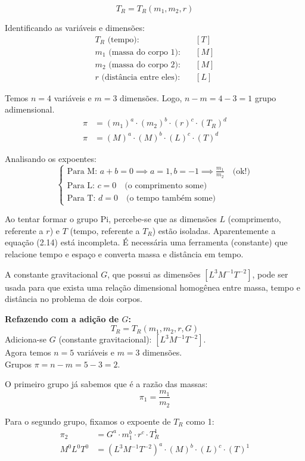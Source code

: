 

\[ T_R = T_R(m_1, m_2, r) \]

\noindent Identificando as variáveis e dimensões:
\begin{align*}
T_R \text{ (tempo):} \quad &[T] \\
m_1 \text{ (massa do corpo 1):} \quad &[M] \\
m_2 \text{ (massa do corpo 2):} \quad &[M] \\
r \text{ (distância entre eles):} \quad &[L]
\end{align*}

Temos $n = 4$ variáveis e $m = 3$ dimensões. Logo, $n - m = 4 - 3 = 1$ grupo adimensional.
\begin{align*}
\pi &= (m_1)^a \cdot (m_2)^b \cdot (r)^c \cdot (T_R)^d \\
\pi &= (M)^a \cdot (M)^b \cdot (L)^c \cdot (T)^d
\end{align*}

Analisando os expoentes:
\[
\begin{cases}
\text{Para M: } a + b = 0 \implies a = 1, b = -1 \implies \frac{m_1}{m_2} \quad \text{(ok!)} \\
\text{Para L: } c = 0 \quad \text{(o comprimento some)} \\
\text{Para T: } d = 0 \quad \text{(o tempo também some)}
\end{cases}
\]

Ao tentar formar o grupo Pi, percebe-se que as dimensões $L$ (comprimento, referente a $r$) e $T$ (tempo, referente a $T_R$) estão isoladas. Aparentemente a equação (2.14) está incompleta. É necessária uma ferramenta (constante) que relacione tempo e espaço e converta massa e distância em tempo. 

A constante gravitacional $G$, que possui as dimensões $[L^3 M^{-1} T^{-2}]$, pode ser usada para que exista uma relação dimensional homogênea entre massa, tempo e distância no problema de dois corpos.

\vspace{0.5cm}
\noindent\textbf{Refazendo com a adição de $G$:}
\[ T_R = T_R(m_1, m_2, r, G) \]
Adiciona-se $G$ (constante gravitacional): $[L^3 M^{-1} T^{-2}]$. \\
Agora temos $n = 5$ variáveis e $m = 3$ dimensões. \\
Grupos $\pi = n - m = 5 - 3 = 2$.

O primeiro grupo já sabemos que é a razão das massas:
\[ \pi_1 = \frac{m_1}{m_2} \]

Para o segundo grupo, fixamos o expoente de $T_R$ como 1:
\begin{align*}
\pi_2 &= G^a \cdot m_1^b \cdot r^c \cdot T_R^1 \\
M^0 L^0 T^0 &= (L^3 M^{-1} T^{-2})^a \cdot (M)^b \cdot (L)^c \cdot (T)^1
\end{align*}

